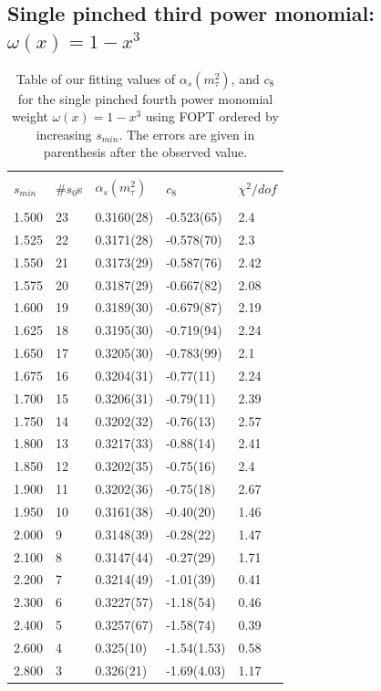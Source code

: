 \documentclass[../../index.tex]{subfiles}
\begin{document}
\subsection{Single pinched third power monomial: $\omega(x) = 1-x^3$}
\begin{table}[H]
  \centering
  \begin{tabular}{lllll}
    \toprule \\
    $s_{min}$ & \#$s_0$s & $\alpha_s(m_\tau^2)$ & $c_8$ &  $\chi^2/dof$  \\
    \hline \\
    1.500 & 23 & 0.3160(28) & -0.523(65) & 2.4 \\
    1.525 & 22 & 0.3171(28) & -0.578(70) & 2.3 \\
    1.550 & 21 & 0.3173(29) & -0.587(76) & 2.42 \\
    1.575 & 20 & 0.3187(29) & -0.667(82) & 2.08 \\
    1.600 & 19 & 0.3189(30) & -0.679(87) & 2.19 \\
    1.625 & 18 & 0.3195(30) & -0.719(94) & 2.24 \\
    1.650 & 17 & 0.3205(30) & -0.783(99) & 2.1 \\
    1.675 & 16 & 0.3204(31) & -0.77(11) & 2.24 \\
    1.700 & 15 & 0.3206(31) & -0.79(11) & 2.39 \\
    1.750 & 14 & 0.3202(32) & -0.76(13) & 2.57 \\
    1.800 & 13 & 0.3217(33) & -0.88(14) & 2.41 \\
    1.850 & 12 & 0.3202(35) & -0.75(16) & 2.4 \\
    1.900 & 11 & 0.3202(36) & -0.75(18) & 2.67 \\
    1.950 & 10 & 0.3161(38) & -0.40(20) & 1.46 \\
    2.000 & 9  & 0.3148(39) & -0.28(22) & 1.47 \\
    2.100 & 8  & 0.3147(44) & -0.27(29) & 1.71 \\
    2.200 & 7  & 0.3214(49) & -1.01(39) & 0.41 \\
    2.300 & 6  & 0.3227(57) & -1.18(54) & 0.46 \\
    2.400 & 5  & 0.3257(67) & -1.58(74) & 0.39 \\
    2.600 & 4  & 0.325(10) & -1.54(1.53) & 0.58 \\
    2.800 & 3  & 0.326(21) & -1.69(4.03) & 1.17 \\
    \bottomrule
  \end{tabular}
  \caption{Table of our fitting values of $\alpha_s(m_\tau^2)$, and
    $c_{8}$ for the single pinched fourth power monomial weight $\omega(x)=1-x^3$ using FOPT ordered
    by increasing $s_{min}$. The errors are given in parenthesis after the observed value.}
  \label{table:fitWCubicAlD6D8D10}
\end{table}
\end{document}
